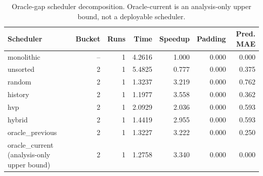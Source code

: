 \begin{table}[t]
\centering
\caption{Oracle-gap scheduler decomposition. Oracle-current is an analysis-only upper bound, not a deployable scheduler.}
\label{tab:oracle-gap}
\begin{tabular}{lrrrrrr}
\hline
Scheduler & Bucket & Runs & Time & Speedup & Padding & Pred. MAE \\
\hline
monolithic & -- & 1 & 4.2616 & 1.000 & 0.000 & 0.000 \\
unsorted & 2 & 1 & 5.4825 & 0.777 & 0.000 & 0.375 \\
random & 2 & 1 & 1.3237 & 3.219 & 0.000 & 0.762 \\
history & 2 & 1 & 1.1977 & 3.558 & 0.000 & 0.362 \\
hvp & 2 & 1 & 2.0929 & 2.036 & 0.000 & 0.593 \\
hybrid & 2 & 1 & 1.4419 & 2.955 & 0.000 & 0.593 \\
oracle\_previous & 2 & 1 & 1.3227 & 3.222 & 0.000 & 0.250 \\
oracle\_current (analysis-only upper bound) & 2 & 1 & 1.2758 & 3.340 & 0.000 & 0.000 \\
\hline
\end{tabular}
\end{table}
